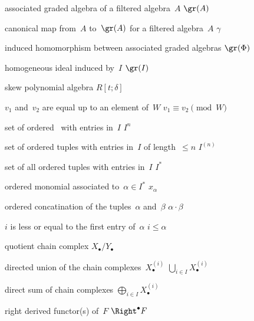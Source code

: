 {associated graded algebra of a filtered algebra~$A$}
{$\gr(A)$}

{canonical map from~$A$ to~$\gr(A)$ for a filtered algebra~$A$}
{$\gamma$}

{induced homomorphism between associated graded algebras}
{$\gr(\Phi)$}

{homogeneous ideal induced by~$I$}
{$\gr(I)$}

{skew polynomial algebra}
{$R[t; \delta]$}

{$v_1$ and~$v_2$ are equal up to an element of~$W$}
{$v_1 \equiv v_2 \pmod{W}$}

{set of ordered~ with entries in~$I$}
{$I^n$}

{set of ordered tuples with entries in~$I$ of length~$\leq n$}
{$I^{(n)}$}

{set of all ordered tuples with entries in~$I$}
{$I^*$}

{ordered monomial associated to~$\alpha \in I^*$}
{$x_\alpha$}

{ordered concatination of the tuples~$\alpha$ and~$\beta$}
{$\alpha \cdot \beta$}

{$i$ is less or equal to the first entry of~$\alpha$}
{$i \leq \alpha$}

{quotient chain complex}
{$X_\bullet / Y_\bullet$}

{directed union of the chain complexes~$X_\bullet^{(i)}$}
{$\bigcup_{i \in I} X_\bullet^{(i)}$}

{direct sum of chain complexes}
{$\bigoplus_{i \in I} X_\bullet^{(i)}$}

{right derived functor(s) of~$F$}
{$\Right^\bullet F$}
